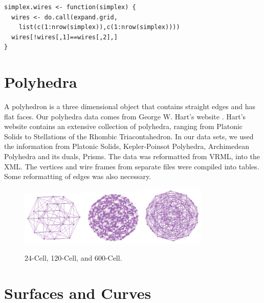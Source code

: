 \documentclass[article]{jss}
\begin{document}
\begin{verbatim}
simplex.wires <- function(simplex) {
  wires <- do.call(expand.grid, 
    list(c(1:nrow(simplex)),c(1:nrow(simplex))))
  wires[!wires[,1]==wires[,2],]
}
\end{verbatim}

\section{Polyhedra}

A polyhedron is a three dimensional object that contains straight
edges and has flat faces. Our polyhedra data comes from George
W. Hart's website \citep{GeorgeVP}. Hart's website contains an
extensive collection of polyhedra, ranging from Platonic Solids to
Stellations of the Rhombic Triacontahedron. In our data sets, we used
the information from Platonic Solids, Kepler-Poinsot Polyhedra,
Archimedean Polyhedra and its duals, Prisms. The data was reformatted
from VRML, into the XML. The vertices and wire frames from separate
files were compiled into tables. Some reformatting of edges was also
necessary.

\begin{figure}[ht]
\centerline{
\includegraphics[width=1.2in]{24-cell.pdf}\includegraphics[width=1.2in]{120-cell.pdf}\includegraphics[width=1.2in]{600-cell.pdf}}
\caption{24-Cell, 120-Cell, and 600-Cell.}
\end{figure}

\section{Surfaces and Curves}
\end{document}
